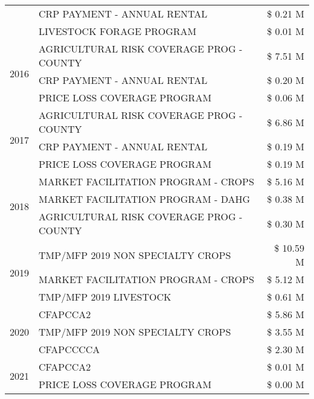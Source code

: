 \begin{tabular}{llr}
 & CRP PAYMENT - ANNUAL RENTAL & \$ 0.21 M \\
 & LIVESTOCK FORAGE PROGRAM & \$ 0.01 M \\
\cline{1-3}
\multirow[t]{3}{*}{2016} & AGRICULTURAL RISK COVERAGE PROG - COUNTY & \$ 7.51 M \\
 & CRP PAYMENT - ANNUAL RENTAL & \$ 0.20 M \\
 & PRICE LOSS COVERAGE PROGRAM & \$ 0.06 M \\
\cline{1-3}
\multirow[t]{3}{*}{2017} & AGRICULTURAL RISK COVERAGE PROG - COUNTY & \$ 6.86 M \\
 & CRP PAYMENT - ANNUAL RENTAL & \$ 0.19 M \\
 & PRICE LOSS COVERAGE PROGRAM & \$ 0.19 M \\
\cline{1-3}
\multirow[t]{3}{*}{2018} & MARKET FACILITATION PROGRAM - CROPS & \$ 5.16 M \\
 & MARKET FACILITATION PROGRAM - DAHG & \$ 0.38 M \\
 & AGRICULTURAL RISK COVERAGE PROG - COUNTY & \$ 0.30 M \\
\cline{1-3}
\multirow[t]{3}{*}{2019} & TMP/MFP 2019 NON SPECIALTY CROPS & \$ 10.59 M \\
 & MARKET FACILITATION PROGRAM - CROPS & \$ 5.12 M \\
 & TMP/MFP 2019 LIVESTOCK & \$ 0.61 M \\
\cline{1-3}
\multirow[t]{3}{*}{2020} & CFAPCCA2 & \$ 5.86 M \\
 & TMP/MFP 2019 NON SPECIALTY CROPS & \$ 3.55 M \\
 & CFAPCCCCA & \$ 2.30 M \\
\cline{1-3}
\multirow[t]{2}{*}{2021} & CFAPCCA2 & \$ 0.01 M \\
 & PRICE LOSS COVERAGE PROGRAM & \$ 0.00 M \\
\cline{1-3}
\bottomrule
\end{tabular}
